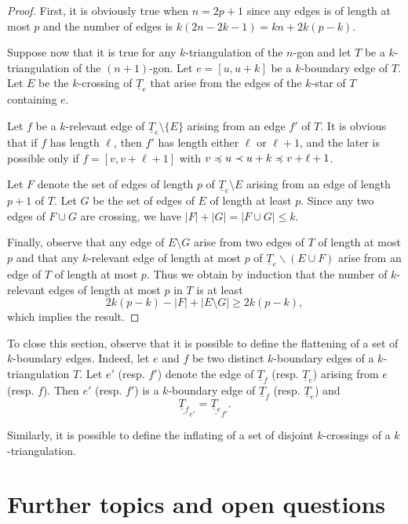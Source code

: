 \documentclass[12pt]{amsart}
\begin{document}
\begin{proof}
First, it is obviously true when $n=2p+1$ since any edges is of length at most $p$ and the number of edges is $k(2n-2k-1)=kn+2k(p-k)$.

Suppose now that it is true for any $k$-triangulation of the $n$-gon and let $T$ be a $k$-triangulation of the $(n+1)$-gon. Let $e=[u,u+k]$ be a $k$-boundary edge of $T$. Let $E$ be the $k$-crossing of $\underline{T}_e$ that arise from the edges of the $k$-star of $T$ containing $e$.

Let $f$ be a $k$-relevant edge of $\underline{T}_e\setminus\{E\}$ arising from an edge $f'$ of $T$. It is obvious that if $f$ has length $\ell$, then $f'$ has length either $\ell$ or $\ell+1$, and the later is possible only if $f=[v,v+\ell+1]$ with $v\preccurlyeq u\prec u+k\preccurlyeq v+\ell+1$.

Let $F$ denote the set of edges of length $p$ of $\underline{T}_e\setminus E$ arising from an edge of length $p+1$ of $T$. Let $G$ be the set of edges  of $E$ of length at least $p$. 
Since any two edges of $F\cup G$ are crossing, we have $|F|+|G|=|F\cup G|\le k$. 

Finally, observe that any edge of $E\setminus G$ arise from two edges of $T$ of length at most $p$ and that any $k$-relevant edge of length at most $p$ of $\underline{T}_e\smallsetminus (E\cup F)$ arise from an edge of $T$ of length at most $p$. Thus we obtain by induction that the number of $k$-relevant edges of length at most $p$ in $T$ is at least
$$2k(p-k)-|F|+|E\setminus G|\ge 2k(p-k),$$
which implies the result.
\end{proof}


To close this section, observe that it is possible to define the flattening of a set of $k$-boundary edges. Indeed, let $e$ and $f$ be two distinct $k$-boundary edges of a $k$-triangulation $T$. Let $e'$ (resp. $f'$) denote the edge of $\underline{T}_f$ (resp. $\underline{T}_e$) arising from $e$ (resp. $f$). Then $e'$ (resp. $f'$) is a $k$-boundary edge of $\underline{T}_f$ (resp. $\underline{T}_e$) and
$$\underline{\underline{T}_f}_{e'}=\underline{\underline{T}_e}_{f'}.$$

Similarly, it is possible to define the inflating of a set of disjoint $k$-crossings of a $k$-triangulation.








\section{Further topics and open questions}\label{sectionopen}
\end{document}
